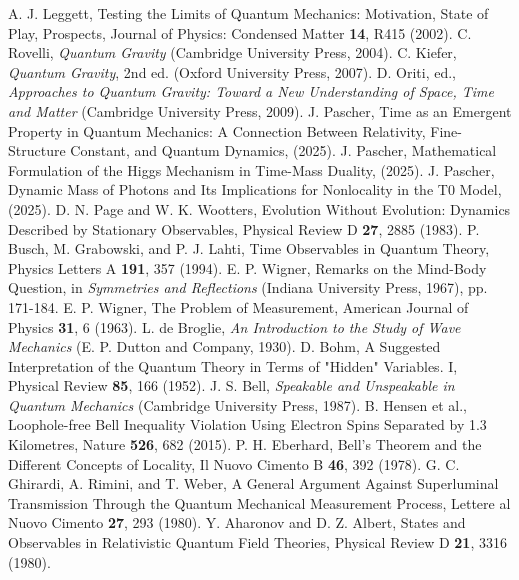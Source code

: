 \documentclass[12pt,a4paper]{article}
\begin{document}
\begin{thebibliography}{99}
		 A. J. Leggett, Testing the Limits of Quantum Mechanics: Motivation, State of Play, Prospects, Journal of Physics: Condensed Matter \textbf{14}, R415 (2002).
		 C. Rovelli, \textit{Quantum Gravity} (Cambridge University Press, 2004).
		 C. Kiefer, \textit{Quantum Gravity}, 2nd ed. (Oxford University Press, 2007).
		 D. Oriti, ed., \textit{Approaches to Quantum Gravity: Toward a New Understanding of Space, Time and Matter} (Cambridge University Press, 2009).
		 J. Pascher, Time as an Emergent Property in Quantum Mechanics: A Connection Between Relativity, Fine-Structure Constant, and Quantum Dynamics, (2025).
		 J. Pascher, Mathematical Formulation of the Higgs Mechanism in Time-Mass Duality, (2025).
		 J. Pascher, Dynamic Mass of Photons and Its Implications for Nonlocality in the T0 Model, (2025).
		 D. N. Page and W. K. Wootters, Evolution Without Evolution: Dynamics Described by Stationary Observables, Physical Review D \textbf{27}, 2885 (1983).
		 P. Busch, M. Grabowski, and P. J. Lahti, Time Observables in Quantum Theory, Physics Letters A \textbf{191}, 357 (1994).
		 E. P. Wigner, Remarks on the Mind-Body Question, in \textit{Symmetries and Reflections} (Indiana University Press, 1967), pp. 171-184.
		 E. P. Wigner, The Problem of Measurement, American Journal of Physics \textbf{31}, 6 (1963).
		 L. de Broglie, \textit{An Introduction to the Study of Wave Mechanics} (E. P. Dutton and Company, 1930).
		 D. Bohm, A Suggested Interpretation of the Quantum Theory in Terms of "Hidden" Variables. I, Physical Review \textbf{85}, 166 (1952).
		 J. S. Bell, \textit{Speakable and Unspeakable in Quantum Mechanics} (Cambridge University Press, 1987).
		 B. Hensen et al., Loophole-free Bell Inequality Violation Using Electron Spins Separated by 1.3 Kilometres, Nature \textbf{526}, 682 (2015).
		 P. H. Eberhard, Bell's Theorem and the Different Concepts of Locality, Il Nuovo Cimento B \textbf{46}, 392 (1978).
		 G. C. Ghirardi, A. Rimini, and T. Weber, A General Argument Against Superluminal Transmission Through the Quantum Mechanical Measurement Process, Lettere al Nuovo Cimento \textbf{27}, 293 (1980).
		 Y. Aharonov and D. Z. Albert, States and Observables in Relativistic Quantum Field Theories, Physical Review D \textbf{21}, 3316 (1980).

\end{thebibliography}
\end{document}
